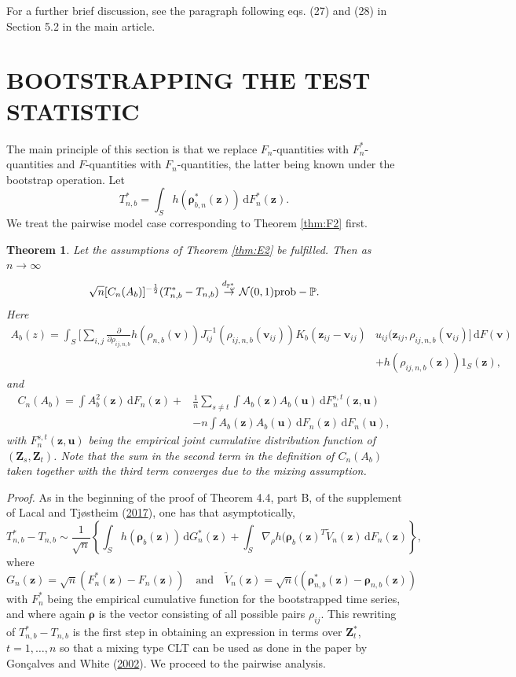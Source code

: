 \documentclass[
  12pt,
  letterpaper]{article}
\newtheorem{thm}{Theorem}[section]
\numberwithin{equation}{section}
\newcommand{\Z}{\bm{Z}}
\newcommand{\z}{\bm{z}}
\newcommand{\fv}{\bm{v}}
\newcommand{\fu}{\bm{u}}
\newcommand{\frho}{\bm{\rho}}
\newcommand{\di}{\,\textrm{d}}
\begin{document}
For a further brief discussion, see the paragraph following eqs. (27) and (28) in Section 5.2 in the main article.

\hypertarget{bootstrapping-the-test-statistic}{%
\section{BOOTSTRAPPING THE TEST STATISTIC}\label{bootstrapping-the-test-statistic}}

The main principle of this section is that we replace \(F_n\)-quantities with \(F_n^{*}\)-quantities and \(F\)-quantities with \(F_n\)-quantities, the latter being known under the bootstrap operation. Let
\[T_{n,b}^* = \int_S h(\frho_{b,n}^*(\z))\di F_n^*(\z).\]
We treat the pairwise model case corresponding to Theorem \ref{thm:F2} first.

\begin{thm}
Let the assumptions of Theorem \ref{thm:E2} be fulfilled. Then
as $n \to \infty$
$$
\sqrt{n}[C_{n}(A_b)]^{-\frac{1}{2}}(T_{n,b}^* - T_{n,b}) \stackrel{d_{\mathbb{P}_{\omega}^{*}}}{\to} {\cal N}(0,1) \mbox{prob}-\mathbb{P}.
$$
Here 
\begin{align*}
A_b(z) = \int_{S} \Big[\sum_{i,j}\frac{\partial}{\partial \rho_{ij,n,b}} h(\rho_{n,b}(\fv))J_{ij}^{-1}(\rho_{ij,n,b}(\fv_{ij}))K_b(\z_{ij}-\fv_{ij})&u_{ij}(\z_{ij},\rho_{ij,n,b}(\fv_{ij})\Big]  \di F(\fv) \\
& + h(\rho_{ij,n,b}(\z))1_S(\z),
\end{align*}
and 
\begin{align}
C_n(A_b) = \int A_b^2(\z)\di F_n(\z) + & \frac{1}{n}\sum_{s \neq t}\int A_b(\z)A_b(\fu)\di F^{s,t}_{n}(\z,\fu) \nonumber \\
& -  n\int A_b(\z)A_b(\fu) \di F_n(\z) \di F_n(\fu), 
\label{eq:t00}
\end{align}
with $F^{s,t}_{n}(\z,\fu)$ being the empirical joint cumulative distribution function of $(\Z_s,\Z_t)$. Note that the sum in the second term in the definition of $C_n(A_b)$ taken together with the third term converges due to the mixing assumption.
\label{thm:H1}
\end{thm}

\emph{Proof.} As in the beginning of the proof of Theorem 4.4, part B, of the supplement of Lacal and Tjøstheim (\protect\hyperlink{ref-lacal2017local}{2017}), one has that asymptotically,
\begin{equation}
T_{n,b}^* - T_{n,b}  \sim \frac{1}{\sqrt{n}} \left\{\int_S h(\frho_b(\z)) \di G_n^*(\z) + \int_S\nabla_{\rho}h(\frho_b(\z)^{T}\tilde{V}_n(\z) \di F_n(\z)\right\},
\label{eq:t11}
\end{equation}
where
\[
G_n(\z) = \sqrt{n}(F_n^*(\z) - F_n(\z)) \quad \mbox{and} \quad \tilde{V}_n(\z) = \sqrt{n}((\frho_{n,b}^{*}(\z) -\frho_{n,b}(\z))
\]
with \(F_n^*\) being the empirical cumulative function for the bootstrapped time series, and where again \(\frho\) is the vector consisting of all possible pairs \(\rho_{ij}\). This rewriting of \(T_{n,b}^*-T_{n,b}\) is the first step in obtaining an expression in terms over \(\Z^*_t\), \(t=1,\dots,n\) so that a mixing type CLT can be used as done in the paper by Gonçalves and White (\protect\hyperlink{ref-gonccalves2002bootstrap}{2002}). We proceed to the pairwise analysis.
\end{document}
